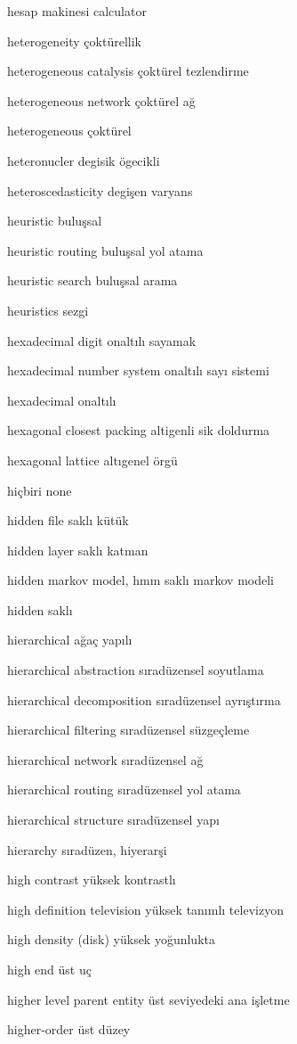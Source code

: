 \documentclass[12pt,fleqn]{article}\usepackage{../../common}
\begin{document}
hesap makinesi calculator

heterogeneity çoktürellik

heterogeneous catalysis çoktürel tezlendirme

heterogeneous network çoktürel ağ

heterogeneous çoktürel

heteronucler degisik ögecikli

heteroscedasticity degişen varyans

heuristic buluşsal

heuristic routing buluşsal yol atama

heuristic search buluşsal arama

heuristics sezgi

hexadecimal digit onaltılı sayamak

hexadecimal number system onaltılı sayı sistemi

hexadecimal onaltılı

hexagonal closest packing altigenli sik doldurma

hexagonal lattice altıgenel örgü

hiçbiri none

hidden file saklı kütük

hidden layer saklı katman

hidden markov model, hmm saklı markov modeli

hidden saklı

hierarchical ağaç yapılı

hierarchical abstraction sıradüzensel soyutlama

hierarchical decomposition sıradüzensel ayrıştırma

hierarchical filtering sıradüzensel süzgeçleme

hierarchical network sıradüzensel ağ

hierarchical routing sıradüzensel yol atama

hierarchical structure sıradüzensel yapı

hierarchy sıradüzen, hiyerarşi

high contrast yüksek kontrastlı

high definition television yüksek tanımlı televizyon

high density (disk) yüksek yoğunlukta

high end üst uç

higher level parent entity üst seviyedeki ana işletme

higher-order üst düzey
\end{document}
